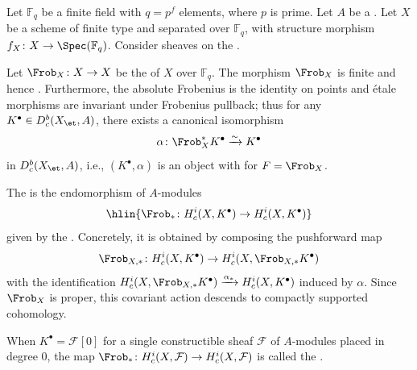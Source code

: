 \begin{definition} \label{definition:frobenius_action_on_compactly_supported_cohomology_with_torsion_coefficients}
    Let $\mathbb{F}_q$ be a finite field with $q = p^f$ elements, where $p$ is prime. Let $A$ be a  . Let $X$ be a scheme of finite type and separated over $\mathbb{F}_q$, with structure morphism $f_X \colon X \to \Spec(\mathbb{F}_q)$. Consider sheaves on the .

    Let $\Frob_X \colon X \to X$ be the  of $X$ over $\mathbb{F}_q$. The morphism $\Frob_X$ is finite and hence . Furthermore, the absolute Frobenius is the identity on points and \'etale morphisms are invariant under Frobenius pullback; thus for any $K^\bullet \in D_c^b(X_{\et}, A)$, there exists a canonical isomorphism
    $$\alpha \colon \Frob_X^* K^\bullet \xrightarrow{\sim} K^\bullet$$
    in $D_c^b(X_{\et}, A)$, i.e., $(K^\bullet, \alpha)$ is an object with  for $F = \Frob_X$.

    The  is the endomorphism of $A$-modules
    $$\hlin{\Frob_* \colon H_c^i(X, K^\bullet) \to H_c^i(X, K^\bullet)}$$
    given by the . Concretely, it is obtained by composing the pushforward map
    $$\Frob_{X,*} \colon H_c^i(X, K^\bullet) \to H_c^i(X, \Frob_{X,*} K^\bullet)$$
    with the identification $H_c^i(X, \Frob_{X,*} K^\bullet) \xrightarrow{\alpha_*} H_c^i(X, K^\bullet)$ induced by $\alpha$. Since $\Frob_X$ is proper, this covariant action descends to compactly supported cohomology.

    When $K^\bullet = \mathcal{F}[0]$ for a single constructible sheaf $\mathcal{F}$ of $A$-modules placed in degree $0$, the map $\Frob_* \colon H_c^i(X, \mathcal{F}) \to H_c^i(X, \mathcal{F})$ is called the .
\end{definition}